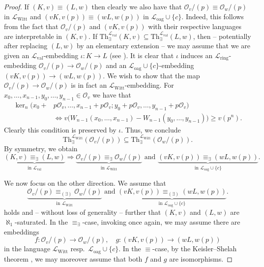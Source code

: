 \documentclass[10pt,a4paper]{amsart}
\renewcommand{\L}{\mathcal{L}}
\newcommand{\LWitt}{\L_{\mathrm{Witt}}}
\newcommand{\Loag}{\L_{\mathrm{oag}}}
\newcommand{\Lring}{\L_{\mathrm{ring}}}
\newcommand{\Lval}{\L_{\mathrm{val}}}
\renewcommand{\O}{\mathcal{O}}
\begin{document}
    \begin{proof}
        If $(K,v)\equiv (L, w)$ then clearly we also have that $\O_v/(p) \equiv \O_w/(p)$ in $\LWitt$ and $(vK, v(p))\equiv (wL, w(p))$ in $\Loag\cup\{c\}$.
        Indeed, this follows from the fact that $\O_v/(p)$ and $(vK, v(p))$ with their respective languages are interpretable in $(K,v)$.
        If $\mathrm{Th}_\exists^{\Lval}{(K,v)} \subseteq \mathrm{Th}_\exists^{\Lval} (L,w)$, then -- potentially after replacing $(L,w)$ by an elementary extension -- we may assume that we are given an $\Lval$-embedding $\iota\colon K\to L$ (see \cite[Proposition 5.2.2]{CK}).
        It is clear that $\iota$ induces an $\Lring$-embedding $\O_v/(p)\to \O_w/(p)$ and an $\Loag\cup\{c\}$-embedding $(vK, v(p))\to (wL, w(p))$.
        We wish to show that the map $\O_v/(p)\to \O_w/(p)$ is in fact an $\LWitt$-embedding.
        For $x_0, \ldots, x_{n-1}, y_0, \ldots, y_{n-1}\in \O_v$ we have that
        \begin{align*}
        \ker_n(x_0+& p\O_v, \ldots, x_{n-1}+p\O_v; y_0+p\O_v, \ldots, y_{n-1}+p\O_v) \\
        &\Longleftrightarrow v\big(W_{n-1}(x_0, \ldots, x_{n-1}) - W_{n-1}(y_0, \ldots, y_{n-1})\big) \geq v(p^n).    
        \end{align*}
        Clearly this condition is preserved by $\iota$.
        Thus, we conclude $$\mathrm{Th}_\exists^{\LWitt}(\O_v/(p))\subseteq \mathrm{Th}_{\exists}^{\LWitt}(\O_w/(p)).$$
        By symmetry, we obtain
        $$\underbrace{(K,v) \equiv_\exists (L,w)}_{\text{in }\mathcal{L}_\mathrm{val}} \Longrightarrow \underbrace{\mathcal{O}_v/(p) \equiv_\exists \mathcal{O}_w/(p)}_{\text{in }\mathcal{L}_{\mathrm{Witt}}}\textrm{ and } \underbrace{(vK,v(p)) \equiv_\exists (wL,w(p))}_{\text{in }\mathcal{L}_{\mathrm{oag}}\cup\{c\}}.$$
        
        We now focus on the other direction. We assume that 
        $$
        \underbrace{\mathcal{O}_v/(p) \equiv_{(\exists)} \mathcal{O}_w/(p)}_{\text{in }\mathcal{L}_{\mathrm{Witt}}}\textrm{ and } \underbrace{(vK,v(p)) \equiv_{(\exists)} (wL,w(p))}_{\text{in }\mathcal{L}_{\mathrm{oag}}\cup\{c\}}.$$
        holds and -- without loss of generality -- further 
        that $(K,v)$ and $(L,w)$ are $\aleph_1$-saturated.
        In the $\equiv_\exists$-case, invoking \cite[Proposition 5.2.2]{CK} once again,
        we may assume there are embeddings
        \[
        f\colon \O_v/(p)\to \O_w/(p), \quad g\colon (vK, v(p))\to (wL, w(p))
        \]
        in the language $\LWitt$ resp.\ $\Loag\cup\{c\}$.
        In the $\equiv$-case, by the Keisler--Shelah theorem \cite[Theorem 6.1.15]{CK}, we may moreover assume that both
        $f$ and $g$ are isomorphisms.


\end{proof}
\end{document}
